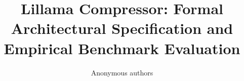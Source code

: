 \title{\textbf{Lillama Compressor: Formal Architectural Specification and Empirical Benchmark Evaluation}}

\author{Anonymous authors}
